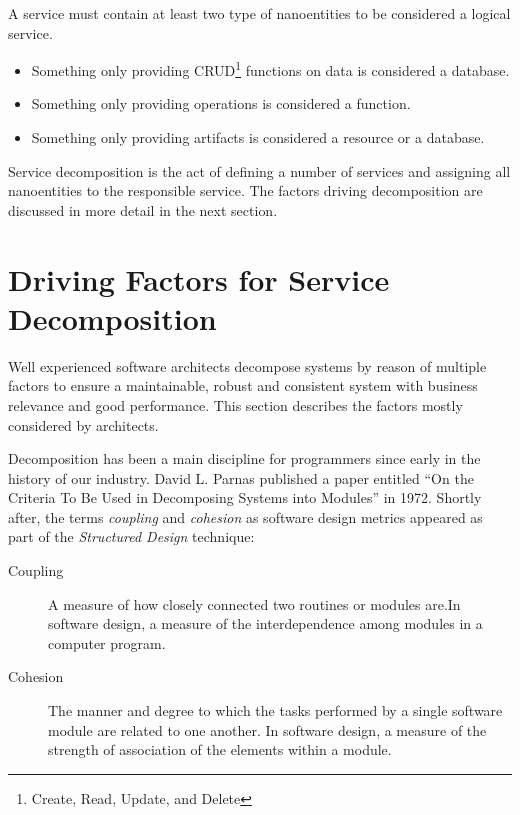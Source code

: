 A service must contain  at least two type of nanoentities to be considered a logical service. 
\begin{itemize}
\item Something only providing CRUD\footnote{Create, Read, Update, and Delete} functions on data is considered a database. 
\item Something only providing operations is considered a function. 
\item Something only providing artifacts is considered a resource or a database. 
\end{itemize}

Service decomposition is the act of defining a number of services and assigning all nanoentities to the responsible service. The factors driving decomposition are discussed in more detail in the next section.


\section{Driving Factors for Service Decomposition}

Well experienced software architects decompose systems by reason of multiple factors to ensure a maintainable, robust and consistent system with business relevance and good performance. This section describes the factors mostly considered by architects. 

Decomposition has been a main discipline for programmers since early in the history of our industry. David L. Parnas published a paper entitled \enquote{On the Criteria To Be Used in Decomposing Systems into Modules} in 1972\cite{parnaDecomposing}. Shortly after, the terms \textit{coupling} and \textit{cohesion} as software design metrics appeared as part of the \textit{Structured Design} technique\cite{structuredDesign}:

\begin{description}
	\item[Coupling] A measure of how closely connected two routines or modules are.\newline In	software design, a measure of the interdependence among modules in a computer program.\cite{softwareVocabulary}
	\item[Cohesion] The manner and degree to which the tasks performed by a single software module are related to one another. \newline 
	In software design, a measure of the strength of association of the elements within a module.\cite{softwareVocabulary}
\end{description}

